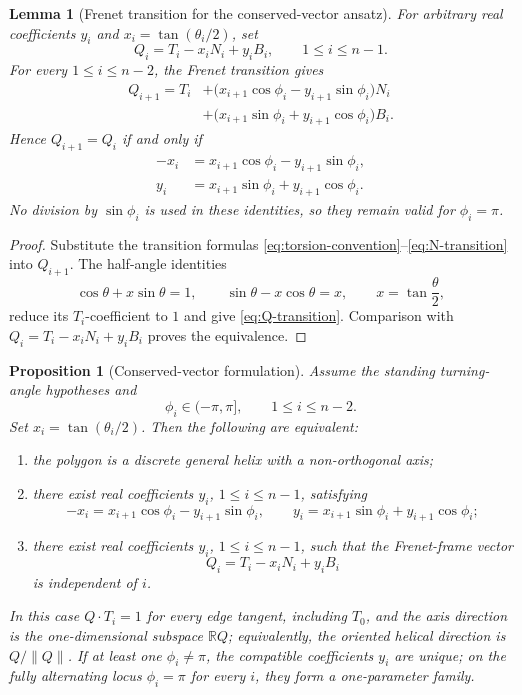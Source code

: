 \documentclass[10pt,a4paper]{amsart}
\newtheorem{lemma}[theorem]{Lemma}
\newtheorem{proposition}[theorem]{Proposition}
\theoremstyle{definition}
\theoremstyle{remark}
\numberwithin{equation}{section}
\begin{document}
\begin{lemma}[Frenet transition for the conserved-vector ansatz]\label{lem:Q-transition}
For arbitrary real coefficients $y_i$ and $x_i=\tan(\theta_i/2)$, set
\[
Q_i=T_i-x_iN_i+y_iB_i,\qquad 1\le i\le n-1.
\]
For every $1\le i\le n-2$, the Frenet transition gives
\begin{equation}
\begin{aligned}
Q_{i+1}=T_i
&+\bigl(x_{i+1}\cos\phi_i-y_{i+1}\sin\phi_i\bigr)N_i\\
&+\bigl(x_{i+1}\sin\phi_i+y_{i+1}\cos\phi_i\bigr)B_i.
\end{aligned}
\label{eq:Q-transition}
\end{equation}
Hence $Q_{i+1}=Q_i$ if and only if
\begin{align}
-x_i&=x_{i+1}\cos\phi_i-y_{i+1}\sin\phi_i,\label{eq:Q-compat1}\\
y_i&=x_{i+1}\sin\phi_i+y_{i+1}\cos\phi_i.\label{eq:Q-compat2}
\end{align}
No division by $\sin\phi_i$ is used in these identities, so they remain valid for $\phi_i=\pi$.
\end{lemma}

\begin{proof}
Substitute the transition formulas \eqref{eq:torsion-convention}--\eqref{eq:N-transition} into $Q_{i+1}$.  The half-angle identities
\[
\cos\theta+x\sin\theta=1,\qquad
\sin\theta-x\cos\theta=x,
\qquad x=\tan\frac{\theta}{2},
\]
reduce its $T_i$-coefficient to $1$ and give \eqref{eq:Q-transition}.  Comparison with $Q_i=T_i-x_iN_i+y_iB_i$ proves the equivalence.
\end{proof}

\begin{proposition}[Conserved-vector formulation]\label{prop:conserved-vector}
Assume the standing turning-angle hypotheses and
\[
\phi_i\in(-\pi,\pi],\qquad 1\le i\le n-2.
\]
Set $x_i=\tan(\theta_i/2)$. Then the following are equivalent:
\begin{enumerate}[label=\textup{(\alph*)}]
\item the polygon is a discrete general helix with a non-orthogonal axis;
\item there exist real coefficients $y_i$, $1\le i\le n-1$, satisfying
\[
-x_i=x_{i+1}\cos\phi_i-y_{i+1}\sin\phi_i,\qquad
y_i=x_{i+1}\sin\phi_i+y_{i+1}\cos\phi_i;
\]
\item there exist real coefficients $y_i$, $1\le i\le n-1$, such that the Frenet-frame vector
\[
Q_i=T_i-x_iN_i+y_iB_i
\]
is independent of $i$.
\end{enumerate}
In this case $Q\cdot T_i=1$ for every edge tangent, including $T_0$, and the axis direction is the one-dimensional subspace $\mathbb R Q$; equivalently, the oriented helical direction is $Q/\lVert Q\rVert$. If at least one $\phi_i\ne\pi$, the compatible coefficients $y_i$ are unique; on the fully alternating locus $\phi_i=\pi$ for every $i$, they form a one-parameter family.
\end{proposition}
\end{document}

